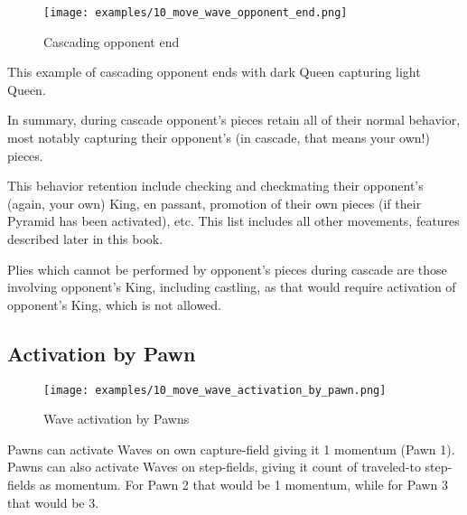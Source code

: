 \clearpage %

\noindent
\begin{wrapfigure}[4]{l}{0.5625\textwidth}
\texttt{[image: examples/10\_move\_wave\_opponent\_end.png]}
\caption{Cascading opponent end}
\label{fig:10_move_wave_opponent_end}
\end{wrapfigure}
This example of cascading opponent ends with dark Queen capturing light Queen.

\vspace*{0.355\textheight}
In summary, during cascade opponent's pieces retain all of their normal behavior,
most notably capturing their opponent's (in cascade, that means your own!) pieces.

This behavior retention include checking and checkmating their opponent's (again,
your own) King, en passant, promotion of their own pieces (if their Pyramid has
been activated), etc. This list includes all other movements, features described
later in this book.

Plies which cannot be performed by opponent's pieces during cascade are those
involving opponent's King, including castling, as that would require activation
of opponent's King, which is not allowed.

\clearpage %

\subsection*{Activation by Pawn}

\noindent
\begin{figure}[!h]
\texttt{[image: examples/10\_move\_wave\_activation\_by\_pawn.png]}
\caption{Wave activation by Pawns}
\label{fig:10_move_wave_activation_by_pawn}
\end{figure}

Pawns can activate Waves on own capture-field giving it 1 momentum (Pawn 1).
Pawns can also activate Waves on step-fields, giving it count of traveled-to
step-fields as momentum. For Pawn 2 that would be 1 momentum, while for Pawn 3
that would be 3.

\clearpage %

